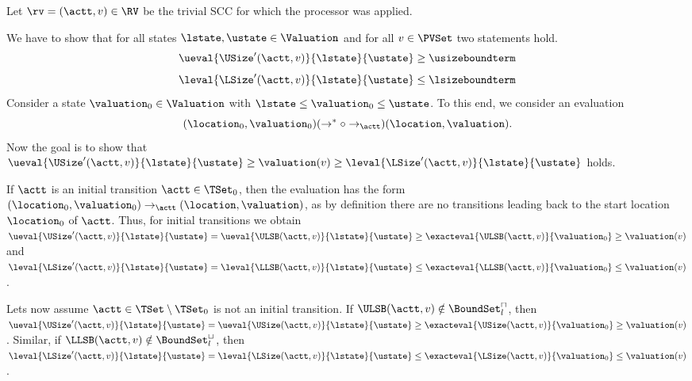 Let $\rv = (\actt, v) \in \RV$ be the trivial SCC for which the processor was applied.

We have to show that for all states $\lstate, \ustate \in \Valuation$ and for all $v \in \PVSet$ two statements hold.
\[ \ueval{\USize'(\actt, v)}{\lstate}{\ustate} \geq \usizeboundterm \]
\[ \leval{\LSize'(\actt, v)}{\lstate}{\ustate} \leq \lsizeboundterm \]
Consider a state $\valuation_0 \in \Valuation$ with $\lstate \leq \valuation_0 \leq \ustate$.
To this end, we consider an evaluation
\[ (\location_0, \valuation_0) (\rightarrow^* \circ \rightarrow_\actt) (\location, \valuation). \]
Now the goal is to show that $\ueval{\USize'(\actt, v)}{\lstate}{\ustate} \geq \valuation(v) \geq \leval{\LSize'(\actt, v)}{\lstate}{\ustate}$ holds.

If $\actt$ is an initial transition $\actt \in \TSet_0$, then the evaluation has the form $(\location_0, \valuation_0) \rightarrow_\actt (\location, \valuation)$, as by definition there are no transitions leading back to the start location $\location_0$ of $\actt$.
Thus, for initial transitions we obtain $\ueval{\USize'(\actt, v)}{\lstate}{\ustate} = \ueval{\ULSB(\actt, v)}{\lstate}{\ustate} \geq \exacteval{\ULSB(\actt, v)}{\valuation_0} \geq \valuation(v)$ and $\leval{\LSize'(\actt, v)}{\lstate}{\ustate} = \leval{\LLSB(\actt, v)}{\lstate}{\ustate} \leq \exacteval{\LLSB(\actt, v)}{\valuation_0} \leq \valuation(v)$.

Lets now assume $\actt \in \TSet \setminus \TSet_0$ is not an initial transition.
If $\ULSB(\actt,v) \notin \BoundSet^\sqcap_l$, then $\ueval{\USize'(\actt, v)}{\lstate}{\ustate} = \ueval{\USize(\actt, v)}{\lstate}{\ustate} \geq \exacteval{\USize(\actt, v)}{\valuation_0} \geq \valuation(v)$.
Similar, if $\LLSB(\actt,v) \notin \BoundSet^\sqcup_l$, then $\leval{\LSize'(\actt, v)}{\lstate}{\ustate} = \leval{\LSize(\actt, v)}{\lstate}{\ustate} \leq \exacteval{\LSize(\actt, v)}{\valuation_0} \leq \valuation(v)$.

